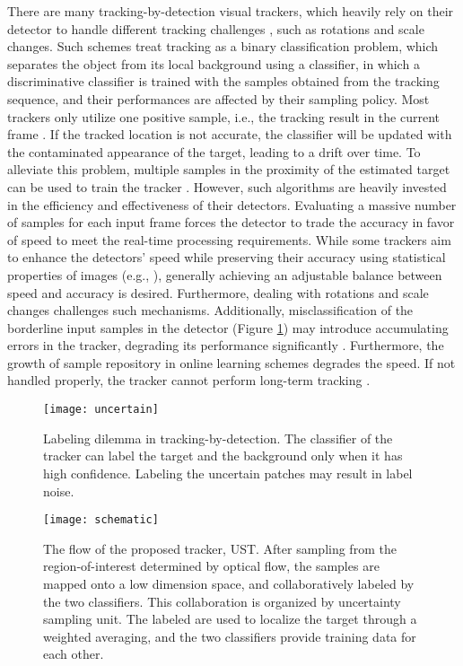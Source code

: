 \documentclass[conference,twoside]{IEEEtran}
\begin{document}
There are many tracking-by-detection visual trackers, which heavily rely on their detector to handle different tracking challenges \cite{hare2011struck}, such as rotations and scale changes. Such schemes treat tracking as a binary classification problem, which separates the object from its local background using a classifier, in which a discriminative classifier is trained with the samples obtained from the tracking sequence, and their performances are affected by their sampling policy. Most trackers only utilize one positive sample, i.e., the tracking result in the current frame \cite{grabner2006real}. If the tracked location is not accurate, the classifier will be updated with the contaminated appearance of the target, leading to a drift over time. To alleviate this problem, multiple samples in the proximity of the estimated target can be used to train the tracker \cite{babenko2009visual,hare2011struck}. However, such algorithms are heavily invested in the efficiency and effectiveness of their detectors. Evaluating a massive number of samples for each input frame forces the detector to trade the accuracy in favor of speed to meet the real-time processing requirements. While some trackers aim to enhance the detectors' speed while preserving their accuracy using statistical properties of images (e.g., \cite{henriques2012exploiting}), generally achieving an adjustable balance between speed and accuracy is desired. Furthermore, dealing with rotations and scale changes challenges such mechanisms. Additionally, misclassification of the borderline input samples in the detector (Figure \ref{fig:uncertain}) may introduce accumulating errors in the tracker, degrading its performance significantly \cite{babenko2009visual}. Furthermore, the growth of sample repository in online learning schemes degrades the speed. If not handled properly, the tracker cannot perform long-term tracking \cite{hare2011struck}.

\begin{figure}[!t]
\centering
\texttt{[image: uncertain]}
\caption{Labeling dilemma in tracking-by-detection. The classifier of the tracker can label the target and the background  only when it has high confidence. Labeling the uncertain patches may result in label noise. }
\label{fig:uncertain}
\vspace{-0.5 cm}
\end{figure}

\begin{figure*}
\centering
\texttt{[image: schematic]}
\caption{The flow of the proposed tracker, UST. After sampling from the region-of-interest determined by optical flow, the samples are mapped onto a low dimension space, and collaboratively labeled by the two classifiers. This collaboration is organized by uncertainty sampling unit. The labeled are used to localize the target through a weighted averaging, and the two classifiers provide training data for each other.}
\label{fig:schematic}
\vspace{-0.7 cm}
\end{figure*}
\end{document}
